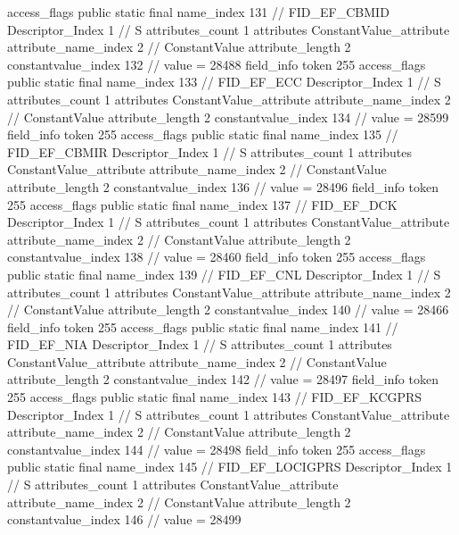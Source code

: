 {{{{{				access_flags	public static final
				name_index	131		// FID_EF_CBMID
				Descriptor_Index	1		// S
				attributes_count	1
				attributes {
				ConstantValue_attribute {
					attribute_name_index	2		// ConstantValue
					attribute_length	2
					constantvalue_index	132		// value = 28488
				}
				}
			}
			field_info {
				token	255
				access_flags	public static final
				name_index	133		// FID_EF_ECC
				Descriptor_Index	1		// S
				attributes_count	1
				attributes {
				ConstantValue_attribute {
					attribute_name_index	2		// ConstantValue
					attribute_length	2
					constantvalue_index	134		// value = 28599
				}
				}
			}
			field_info {
				token	255
				access_flags	public static final
				name_index	135		// FID_EF_CBMIR
				Descriptor_Index	1		// S
				attributes_count	1
				attributes {
				ConstantValue_attribute {
					attribute_name_index	2		// ConstantValue
					attribute_length	2
					constantvalue_index	136		// value = 28496
				}
				}
			}
			field_info {
				token	255
				access_flags	public static final
				name_index	137		// FID_EF_DCK
				Descriptor_Index	1		// S
				attributes_count	1
				attributes {
				ConstantValue_attribute {
					attribute_name_index	2		// ConstantValue
					attribute_length	2
					constantvalue_index	138		// value = 28460
				}
				}
			}
			field_info {
				token	255
				access_flags	public static final
				name_index	139		// FID_EF_CNL
				Descriptor_Index	1		// S
				attributes_count	1
				attributes {
				ConstantValue_attribute {
					attribute_name_index	2		// ConstantValue
					attribute_length	2
					constantvalue_index	140		// value = 28466
				}
				}
			}
			field_info {
				token	255
				access_flags	public static final
				name_index	141		// FID_EF_NIA
				Descriptor_Index	1		// S
				attributes_count	1
				attributes {
				ConstantValue_attribute {
					attribute_name_index	2		// ConstantValue
					attribute_length	2
					constantvalue_index	142		// value = 28497
				}
				}
			}
			field_info {
				token	255
				access_flags	public static final
				name_index	143		// FID_EF_KCGPRS
				Descriptor_Index	1		// S
				attributes_count	1
				attributes {
				ConstantValue_attribute {
					attribute_name_index	2		// ConstantValue
					attribute_length	2
					constantvalue_index	144		// value = 28498
				}
				}
			}
			field_info {
				token	255
				access_flags	public static final
				name_index	145		// FID_EF_LOCIGPRS
				Descriptor_Index	1		// S
				attributes_count	1
				attributes {
				ConstantValue_attribute {
					attribute_name_index	2		// ConstantValue
					attribute_length	2
					constantvalue_index	146		// value = 28499
}}}}}}}
